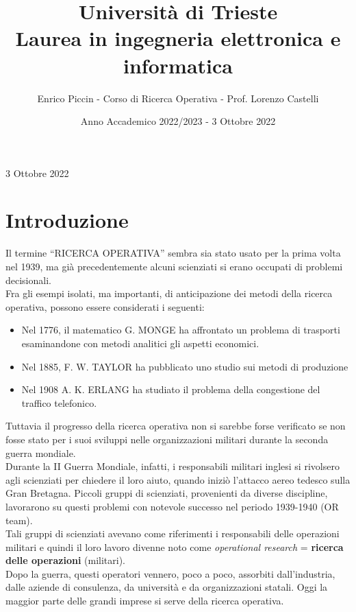\documentclass[a4paper]{extarticle}
\title{\textbf{Università di Trieste\\ \vspace{1em}
Laurea in ingegneria elettronica e informatica}}
\author{Enrico Piccin - Corso di Ricerca Operativa - Prof. Lorenzo Castelli}
\date{Anno Accademico 2022/2023 - 3 Ottobre 2022}
\newcommand{\quotes}[1]{``#1''}
\begin{document}
\vspace{-10mm}
\maketitle

\tableofcontents
\newpage
\begin{center}
    3 Ottobre 2022
\end{center}

\vspace{1em}
\noindent
\section{Introduzione}
Il termine \quotes{RICERCA OPERATIVA} sembra sia stato usato per la prima volta nel 1939, ma già precedentemente alcuni scienziati si erano occupati di problemi decisionali.\\
Fra gli esempi isolati, ma importanti, di anticipazione dei metodi della ricerca operativa, possono essere considerati i seguenti:
\begin{itemize}
    \item Nel 1776, il matematico G. MONGE ha affrontato un problema di trasporti esaminandone con metodi analitici gli aspetti economici.
    \item Nel 1885, F. W. TAYLOR ha pubblicato uno studio sui metodi di produzione
    \item Nel 1908 A. K. ERLANG ha studiato il problema della congestione del traffico telefonico.
\end{itemize}
Tuttavia il progresso della ricerca operativa non si sarebbe forse verificato se non fosse stato per i suoi sviluppi nelle organizzazioni militari durante la seconda guerra mondiale.\\
Durante la II Guerra Mondiale, infatti, i responsabili militari inglesi si rivolsero agli scienziati per chiedere il loro aiuto, quando iniziò l'attacco aereo tedesco sulla Gran Bretagna. Piccoli gruppi di scienziati, provenienti da diverse discipline, lavorarono su questi problemi con notevole successo nel periodo 1939-1940 (OR team).\\
Tali gruppi di scienziati avevano come riferimenti i responsabili delle operazioni militari e quindi il loro lavoro divenne noto come \textit{operational research} = \textbf{ricerca delle operazioni} (militari).\\
Dopo la guerra, questi operatori vennero, poco a poco, assorbiti dall'industria, dalle aziende di consulenza, da università e da organizzazioni statali. Oggi la maggior parte delle grandi imprese si serve della ricerca operativa.
\end{document}
